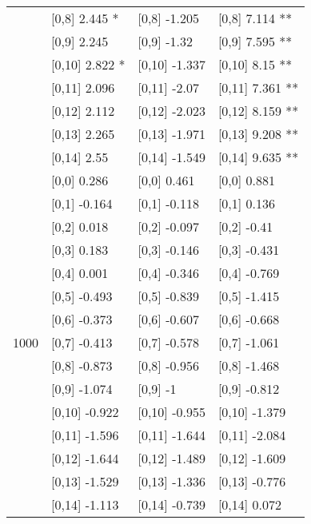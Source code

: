 \begin{table}
\begin{tabular}[t]{llll}
 & {}[0,8] 2.445 * & {}[0,8] -1.205 & {}[0,8] 7.114 **\\
 & {}[0,9] 2.245 & {}[0,9] -1.32 & {}[0,9] 7.595 **\\
\addlinespace
 & {}[0,10] 2.822 * & {}[0,10] -1.337 & {}[0,10] 8.15 **\\
 & {}[0,11] 2.096 & {}[0,11] -2.07 & {}[0,11] 7.361 **\\
 & {}[0,12] 2.112 & {}[0,12] -2.023 & {}[0,12] 8.159 **\\
 & {}[0,13] 2.265 & {}[0,13] -1.971 & {}[0,13] 9.208 **\\
 & {}[0,14] 2.55 & {}[0,14] -1.549 & {}[0,14] 9.635 **\\
\addlinespace
 & {}[0,0] 0.286 & {}[0,0] 0.461 & {}[0,0] 0.881\\
 & {}[0,1] -0.164 & {}[0,1] -0.118 & {}[0,1] 0.136\\
 & {}[0,2] 0.018 & {}[0,2] -0.097 & {}[0,2] -0.41\\
 & {}[0,3] 0.183 & {}[0,3] -0.146 & {}[0,3] -0.431\\
 & {}[0,4] 0.001 & {}[0,4] -0.346 & {}[0,4] -0.769\\
\addlinespace
 & {}[0,5] -0.493 & {}[0,5] -0.839 & {}[0,5] -1.415\\
 & {}[0,6] -0.373 & {}[0,6] -0.607 & {}[0,6] -0.668\\
1000 & {}[0,7] -0.413 & {}[0,7] -0.578 & {}[0,7] -1.061\\
 & {}[0,8] -0.873 & {}[0,8] -0.956 & {}[0,8] -1.468\\
 & {}[0,9] -1.074 & {}[0,9] -1 & {}[0,9] -0.812\\
\addlinespace
 & {}[0,10] -0.922 & {}[0,10] -0.955 & {}[0,10] -1.379\\
 & {}[0,11] -1.596 & {}[0,11] -1.644 & {}[0,11] -2.084\\
 & {}[0,12] -1.644 & {}[0,12] -1.489 & {}[0,12] -1.609\\
 & {}[0,13] -1.529 & {}[0,13] -1.336 & {}[0,13] -0.776\\
 & {}[0,14] -1.113 & {}[0,14] -0.739 & {}[0,14] 0.072\\
\bottomrule
\end{tabular}
\end{table}
